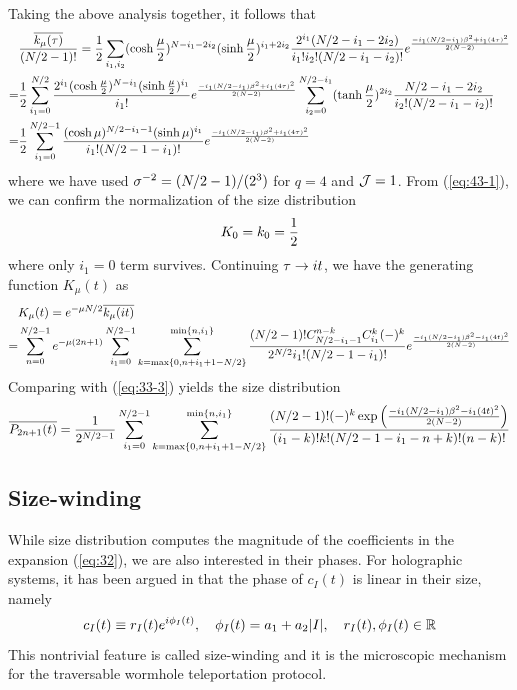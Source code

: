 \documentclass[11pt]{article}
\renewcommand{\>}{\rangle}
\newcommand{\<}{\langle}
\begin{document}
Taking the above analysis together, it follows that
\begin{align}
 & \frac{\overline{k_{\mu}(\tau)}}{(N/2-1)!}=  \frac{1}{2}\sum_{i_{1},i_{2}}(\cosh\frac{\mu}{2})^{N-i_{1}-2i_{2}}(\sinh\frac{\mu}{2})^{i_{1}+2i_{2}}\frac{2^{i_{1}}(N/2-i_{1}-2i_{2})}{i_{1}!i_{2}!(N/2-i_{1}-i_{2})!}e^{\frac{-i_{1}(N/2-i_{1})\beta^{2}+i_{1}(4\tau)^{2}}{2(N-2)}}\nonumber \\
= & \frac{1}{2}\sum_{i_{1}=0}^{N/2}\frac{2^{i_{1}}(\cosh\frac{\mu}{2})^{N-i_{1}}(\sinh\frac{\mu}{2})^{i_{1}}}{i_{1}!}e^{\frac{-i_{1}(N/2-i_{1})\beta^{2}+i_{1}(4\tau)^{2}}{2(N-2)}}\sum_{i_{2}=0}^{N/2-i_{1}}(\tanh\frac{\mu}{2})^{2i_{2}}\frac{N/2-i_{1}-2i_{2}}{i_{2}!(N/2-i_{1}-i_{2})!}\nonumber \\
= & \frac{1}{2}\sum_{i_{1}=0}^{N/2-1}\frac{(\cosh\mu)^{N/2-i_{1}-1}(\sinh\mu)^{i_{1}}}{i_{1}!(N/2-1-i_{1})!}e^{\frac{-i_{1}(N/2-i_{1})\beta^{2}+i_{1}(4\tau)^{2}}{2(N-2)}}\label{eq:43-1}
\end{align}
where we have used $\sigma^{-2}=(N/2-1)/(2^{3})$ for $q=4$ and $\mathcal{J}=1$.
From (\ref{eq:43-1}), we can confirm the normalization of the size distribution
\begin{equation}
K_{0}=k_{0}=\frac{1}{2}
\end{equation}
where only $i_{1}=0$ term survives. Continuing $\tau\rightarrow it$, we
have the generating function $K_{\mu}(t)$ as
\begin{align}
 & K_{\mu}(t)=e^{-\mu N/2}\overline{k_{\mu}(it)}\nonumber \\
= & \sum_{n=0}^{N/2-1}e^{-\mu(2n+1)}\sum_{i_{1}=0}^{N/2-1}\sum_{k=\max\{0,n+i_{1}+1-N/2\}}^{\min\{n,i_{1}\}}\frac{(N/2-1)!C_{N/2-i_{1}-1}^{n-k}C_{i_{1}}^{k}(-)^{k}}{2^{N/2}i_{1}!(N/2-1-i_{1})!}e^{\frac{-i_{1}(N/2-i_{1})\beta^{2}-i_{1}(4t)^{2}}{2(N-2)}}
\end{align}
Comparing with (\ref{eq:33-3}) yields the size distribution
\begin{equation}
\overline{P_{2n+1}(t)}=\frac{1}{2^{N/2-1}}\sum_{i_{1}=0}^{N/2-1}\sum_{k=\max\{0,n+i_{1}+1-N/2\}}^{\min\{n,i_{1}\}}\frac{(N/2-1)!(-)^{k}\exp\left(\frac{-i_{1}(N/2-i_{1})\beta^{2}-i_{1}(4t)^{2}}{2(N-2)}\right)}{(i_{1}-k)!k!(N/2-1-i_{1}-n+k)!(n-k)!}\label{eq:45-1}
\end{equation}


\subsection{Size-winding\label{subsec:Size-winding}}

While size distribution computes the magnitude of the coefficients
in the expansion (\ref{eq:32}), we are also interested in their phases.
For holographic systems, it has been argued in \cite{Brown:2019hmk, Nezami:2021yaq} that the
phase of $c_{I}(t)$ is linear in their size, namely
\begin{equation}
c_{I}(t)\equiv r_{I}(t)e^{i\phi_{I}(t)},\quad\phi_{I}(t)=a_{1}+a_{2}|I|,\quad r_{I}(t),\phi_{I}(t)\in\mathbb{R}
\end{equation}
This nontrivial feature is called size-winding and it is the microscopic mechanism for the traversable wormhole teleportation protocol. 
\end{document}
